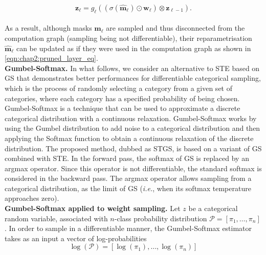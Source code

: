 \begin{equation}
  \label{eqn:chap2:pruned_layer_eq2}
  \mathbf{z}_{\ell} = g_\ell( ( \sigma(\bm{\hat{m}}_\ell) \odot \bm{w}_\ell ) \otimes \mathbf{z}_{\ell-1} ).
\end{equation} \\

\noindent As a result, although masks $\bm{m}_\ell$ are sampled and thus
disconnected from the computation graph (sampling being not differentiable),
their reparametrisation $\bm{\hat{m}}_\ell$ can be updated as if they were used
in the computation graph as shown in \cref{eqn:chap2:pruned_layer_eq}.\\


\noindent\textbf{Gumbel-Softmax.} In what follows, we consider an alternative to
\ac{STE} based on \acf{GS} \cite{DBLP:conf/iclr/JangGP17} that demonstrates
better performances for differentiable categorical sampling, which is the
process of randomly selecting a category from a given set of categories, where
each category has a specified probability of being chosen. Gumbel-Softmax is a
technique that can be used to approximate a discrete categorical distribution
with a continuous relaxation. Gumbel-Softmax works by using the Gumbel
distribution \cite{gumbel1935valeurs} to add noise to a categorical distribution
and then applying the Softmax function to obtain a continuous relaxation of the
discrete distribution. The proposed method, dubbed as \acf{STGS}, is based on a
variant of \acl{GS} combined with \acl{STE}. In the forward pass, the softmax of
\ac{GS} is replaced by an argmax operator. Since this operator is not
differentiable, the standard softmax is considered in the backward pass. The
argmax operator allows sampling from a categorical distribution, as the limit of
\ac{GS} (\emph{i.e.}, when its softmax temperature approaches zero). \\

\noindent \textbf{Gumbel-Softmax applied to weight sampling.} Let $z$ be a
categorical random variable, associated with $n$-class probability distribution
$\mathcal{P} = [\pi_1,\dots,\pi_n]$. In order to sample in a differentiable
manner, the Gumbel-Softmax estimator takes as an input a vector of
log-probabilities \\

\begin{equation}
  \label{eqn:chap2:gumbel-softmax-input}
  \log(\mathcal{P}) =[\log(\pi_1),\dots, \log(\pi_n)]
\end{equation}\\

